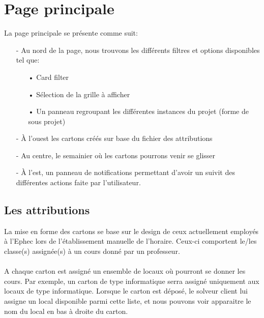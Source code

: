 \section{Page principale}
La page principale se présente comme suit:\\

\begin{itemize}	
	
	\item[-] Au nord de la page, nous trouvons les différents filtres et options disponibles tel que:\\
	\begin{itemize}
		\item[•] Card filter
		\item[•] Sélection de la grille à afficher
		\item[•] Un panneau regroupant les différentes instances du projet (forme de sous projet)\\
	\end{itemize}
	\item[-] À l'ouest les cartons créés sur base du fichier des attributions\\
	\item[-] Au centre, le semainier où les cartons pourrons venir se glisser\\
	\item[-] À l'est, un panneau de notifications permettant d'avoir un suivit des différentes actions faite par l'utilisateur.
\end{itemize}
\subsection{Les attributions}
La mise en forme des cartons se base sur le design de ceux actuellement employés à l'Ephec lors de l'établissement manuelle de l'horaire. Ceux-ci comportent le/les classe(s) assignée(s) à un cours donné par un professeur.\\
\\
A chaque carton est assigné un ensemble de locaux où pourront se donner les cours. Par exemple, un carton de type informatique serra assigné uniquement aux locaux de type informatique. Lorsque le carton est déposé, le solveur client lui assigne un local disponible parmi cette liste, et nous pouvons voir apparaitre le nom du local en bas à droite du carton.
